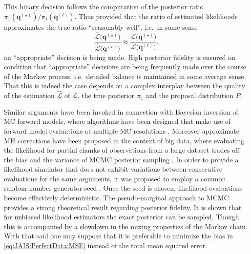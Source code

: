 This binary decision follows the computation of the posterior ratio \(\pi_1(\bm{q}^{(\star)}) / \pi_1(\bm{q}^{(t)})\).
Thus provided that the ratio of estimated likelihoods approximates the true ratio ``reasonably well'', i.e.\ in some sense
\begin{equation} \label{eq:JAIS:MCMC:LikelihoodRatio}
  \frac{\hat{\mathcal{L}} \big( \bm{q}^{(\star)} \big)}{\hat{\mathcal{L}} \big( \bm{q}^{(t)} \big)} \approx \frac{\mathcal{L} \big( \bm{q}^{(\star)} \big)}{\mathcal{L} \big( \bm{q}^{(t)} \big)},
\end{equation}
an ``appropriate'' decision is being made.
High posterior fidelity is ensured on condition that ``appropriate'' decisions are being frequently made over the course of the Markov process, i.e.\ detailed balance is maintained in some average sense.
That this is indeed the case depends on a complex interplay between the quality of the estimation \(\hat{\mathcal{L}}\) of \(\mathcal{L}\), the true posterior \(\pi_1\) and the proposal distribution \(P\).
\par %
Similar arguments have been invoked in connection with Bayesian inversion of MC forward models,
where algorithms have been designed that make use of forward model evaluations at multiple MC resolutions \cite{MCMC:Bal2013}.
Moreover approximate MH corrections have been proposed in the context of big data,
where evaluating the likelihood for partial chunks of observations from a large dataset trades off the bias and the variance of MCMC posterior sampling \cite{MCMC:Korattikara2014,MCMC:Bardenet2014}.
In order to provide a likelihood simulator that does not exhibit variations between consecutive evaluations for the same arguments,
it was proposed to employ a common random number generator seed \cite{NASA:McFarland2014:Proc}.
Once the seed is chosen, likelihood evaluations become effectively deterministic.
The pseudo-marginal approach to MCMC \cite{MCMC:Andrieu2009} provides a strong theoretical result regarding posterior fidelity. 
It is shown that for unbiased likelihood estimators the exact posterior can be sampled.
Though this is accompanied by a slowdown in the mixing properties of the Markov chain.
With that said one may suppose that it is preferable to minimize the bias in \cref{eq:JAIS:PerfectData:MSE} instead of the total mean squared error.